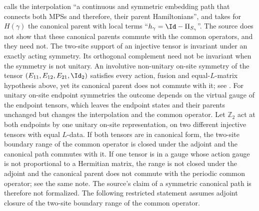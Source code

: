 \cite[Section~5]{GarreRubio2023MPOSym} calls the interpolation ``a
continuous and symmetric embedding path that connects both MPSs and
therefore, their parent Hamiltonians'', and takes for $H(\gamma)$ the
canonical parent with local terms ``$h_\gamma = \Id - \Pi_{S_\gamma}$''.
The source does not show that these canonical parents commute with the
common operators, and they need not. The two-site support of an injective
tensor is invariant under an exactly acting symmetry. Its orthogonal
complement need not be invariant when the symmetry is not unitary. An
involutive non-unitary on-site symmetry of the tensor
$(E_{11},E_{12},E_{21},\Id_2)$ satisfies every action, fusion and
equal-$L$-matrix hypothesis above, yet its canonical parent does not
commute with it; see \cite{gap:glm23_mixed_path_parent_commutation}.
For unitary on-site endpoint symmetries the outcome depends on the
virtual gauge of the endpoint tensors, which leaves the endpoint states
and their parents unchanged but changes the interpolation and the common
operator. Let $\mathbb Z_2$ act at both endpoints by one unitary on-site
representation, on two different injective tensors with equal $L$-data.
If both tensors are in canonical form, the two-site boundary range of the
common operator is closed under the adjoint and the canonical path
commutes with it. If one tensor is in a gauge whose action gauge is not
proportional to a Hermitian matrix, the range is not closed under the
adjoint and the canonical parent does not commute with the periodic
common operator; see the same note.
The source's claim of a symmetric canonical path is therefore not
formalized. The following restricted statement assumes adjoint closure
of the two-site boundary range of the common operator.

